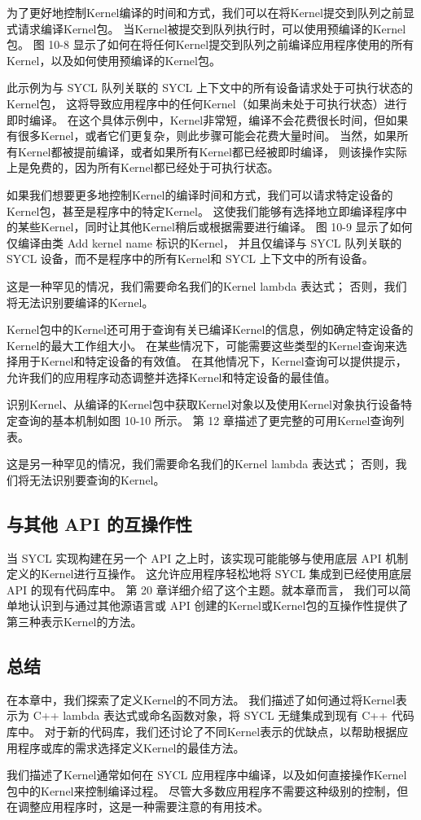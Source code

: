 为了更好地控制Kernel编译的时间和方式，我们可以在将Kernel提交到队列之前显式请求编译Kernel包。 
当Kernel被提交到队列执行时，可以使用预编译的Kernel包。 
图 10-8 显示了如何在将任何Kernel提交到队列之前编译应用程序使用的所有Kernel，以及如何使用预编译的Kernel包。

此示例为与 SYCL 队列关联的 SYCL 上下文中的所有设备请求处于可执行状态的Kernel包，
这将导致应用程序中的任何Kernel（如果尚未处于可执行状态）进行即时编译。 
在这个具体示例中，Kernel非常短，编译不会花费很长时间，但如果有很多Kernel，或者它们更复杂，则此步骤可能会花费大量时间。 
当然，如果所有Kernel都被提前编译，或者如果所有Kernel都已经被即时编译，
则该操作实际上是免费的，因为所有Kernel都已经处于可执行状态。

如果我们想要更多地控制Kernel的编译时间和方式，我们可以请求特定设备的Kernel包，甚至是程序中的特定Kernel。 
这使我们能够有选择地立即编译程序中的某些Kernel，同时让其他Kernel稍后或根据需要进行编译。 
图 10-9 显示了如何仅编译由类 Add kernel name 标识的Kernel，
并且仅编译与 SYCL 队列关联的 SYCL 设备，而不是程序中的所有Kernel和 SYCL 上下文中的所有设备。

这是一种罕见的情况，我们需要命名我们的Kernel lambda 表达式； 否则，我们将无法识别要编译的Kernel。

Kernel包中的Kernel还可用于查询有关已编译Kernel的信息，例如确定特定设备的Kernel的最大工作组大小。 
在某些情况下，可能需要这些类型的Kernel查询来选择用于Kernel和特定设备的有效值。 
在其他情况下，Kernel查询可以提供提示，允许我们的应用程序动态调整并选择Kernel和特定设备的最佳值。

识别Kernel、从编译的Kernel包中获取Kernel对象以及使用Kernel对象执行设备特定查询的基本机制如图 10-10 所示。 
第 12 章描述了更完整的可用Kernel查询列表。

这是另一种罕见的情况，我们需要命名我们的Kernel lambda 表达式； 否则，我们将无法识别要查询的Kernel。

\subsection{与其他 API 的互操作性}
当 SYCL 实现构建在另一个 API 之上时，该实现可能能够与使用底层 API 机制定义的Kernel进行互操作。 
这允许应用程序轻松地将 SYCL 集成到已经使用底层 API 的现有代码库中。 
第 20 章详细介绍了这个主题。就本章而言，
我们可以简单地认识到与通过其他源语言或 API 创建的Kernel或Kernel包的互操作性提供了第三种表示Kernel的方法。

\subsection{总结}
在本章中，我们探索了定义Kernel的不同方法。 
我们描述了如何通过将Kernel表示为 C++ lambda 表达式或命名函数对象，将 SYCL 无缝集成到现有 C++ 代码库中。 
对于新的代码库，我们还讨论了不同Kernel表示的优缺点，以帮助根据应用程序或库的需求选择定义Kernel的最佳方法。

我们描述了Kernel通常如何在 SYCL 应用程序中编译，以及如何直接操作Kernel包中的Kernel来控制编译过程。 
尽管大多数应用程序不需要这种级别的控制，但在调整应用程序时，这是一种需要注意的有用技术。